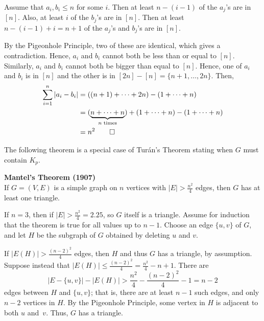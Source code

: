 \documentclass[a4paper]{article}
\let\oldendproof\endproof
\renewenvironment{proof}[1][\proofname]{%
  \oldproof[\scshape \noindent {\bfseries \text{Proof}}]%
}{\oldendproof}
\newenvironment{thm}[1]{
	\begin{framed}
	\noindent
	{\bfseries #1}\\}{
	\end{framed}
}
\begin{document}
\newpage
\begin{proof}
Assume that $a_i, b_i \leq n$ for some $i$.
Then at least $n-(i-1)$ of the $a_j$'s are in $[n]$.
Also, at least $i$ of the $b_j$'s are in $[n]$.
Then at least $n-(i-1)+i = n+1$ of the $a_j$'s and $b_j$'s are in $[n]$.

By the Pigeonhole Principle, two of these are identical, which gives a contradiction.
Hence, $a_i$ and $b_i$ cannot both be less than or equal to $[n]$.
Similarly, $a_i$ and $b_i$ cannot both be bigger than equal to $[n]$.
Hence, one of $a_i$ and $b_i$ is in $[n]$
and the other is in $[2n]-[n] = \{n+1, \ldots, 2n\}$. Then,
\begin{align*}
	\sum_{i=1}^n |a_i - b_i| & = ((n+1) + \cdots + 2n) - (1 + \cdots + n)\\
	& = (\underbrace{n + \cdots + n}_{n \text{ times}}) + (1 + \cdots + n) - (1 + \cdots + n)\\
	& = n^2\qedhere
\end{align*}
\end{proof}

The following theorem is a special case of Tur\'an's Theorem stating when $G$ must contain $K_p$.

\begin{thm}{Mantel's Theorem (1907)}
If $G = (V,E)$ is a simple graph on $n$ vertices with $|E| > \frac{n^2}{4}$ edges,
then $G$ has at least one triangle.
\end{thm}

\begin{proof}
If $n=3$, then if $|E| > \frac{n^2}{4} = 2.25$, so $G$ itself is a triangle.
Assume for induction that the theorem is true for all values up to $n-1$.
Choose an edge $\{u,v\}$ of $G$, and let $H$ be the subgraph of $G$ obtained by deleting $u$ and $v$.

If $|E(H)| > \frac{(n-2)^2}{4}$ edges,
then $H$ and thus $G$ has a triangle, by assumption.\\
Suppose instead that $|E(H)| \leq \frac{(n-2)^2}{4} = \frac{n^2}{4} - n + 1$.
There are
\[
  |E-\{u,v\}| - |E(H)| > \frac{n^2}{4} - \frac{(n-2)^2}{4} - 1 = n-2
\]
edges between $H$ and $\{u,v\}$;
that is, there are at least $n-1$ such edges, and only $n-2$ vertices in $H$.
By the Pigeonhole Principle, some vertex in $H$
is adjacent to both $u$ and~$v$.
Thus, $G$ has a triangle.
\end{proof}
\end{document}
